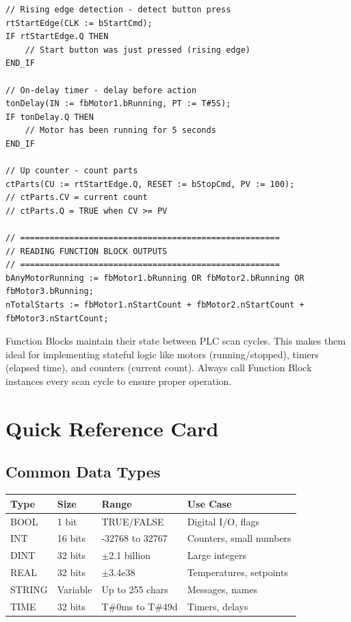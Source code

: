 \documentclass[11pt,a4paper]{article}
\begin{document}
\begin{lstlisting}
// Rising edge detection - detect button press
rtStartEdge(CLK := bStartCmd);
IF rtStartEdge.Q THEN
    // Start button was just pressed (rising edge)
END_IF

// On-delay timer - delay before action
tonDelay(IN := fbMotor1.bRunning, PT := T#5S);
IF tonDelay.Q THEN
    // Motor has been running for 5 seconds
END_IF

// Up counter - count parts
ctParts(CU := rtStartEdge.Q, RESET := bStopCmd, PV := 100);
// ctParts.CV = current count
// ctParts.Q = TRUE when CV >= PV

// =====================================================
// READING FUNCTION BLOCK OUTPUTS
// =====================================================
bAnyMotorRunning := fbMotor1.bRunning OR fbMotor2.bRunning OR fbMotor3.bRunning;
nTotalStarts := fbMotor1.nStartCount + fbMotor2.nStartCount + fbMotor3.nStartCount;
\end{lstlisting}

\begin{tipbox}
Function Blocks maintain their state between PLC scan cycles. This makes them ideal for implementing stateful logic like motors (running/stopped), timers (elapsed time), and counters (current count). Always call Function Block instances every scan cycle to ensure proper operation.
\end{tipbox}

\section*{Quick Reference Card}

\subsection*{Common Data Types}

\begin{table}[h]
\centering
\begin{tabular}{@{}llll@{}}
\toprule
\textbf{Type} & \textbf{Size} & \textbf{Range} & \textbf{Use Case} \\
\midrule
BOOL & 1 bit & TRUE/FALSE & Digital I/O, flags \\
INT & 16 bits & -32768 to 32767 & Counters, small numbers \\
DINT & 32 bits & $\pm$2.1 billion & Large integers \\
REAL & 32 bits & $\pm$3.4e38 & Temperatures, setpoints \\
STRING & Variable & Up to 255 chars & Messages, names \\
TIME & 32 bits & T\#0ms to T\#49d & Timers, delays \\
\bottomrule
\end{tabular}
\end{table}
\end{document}
